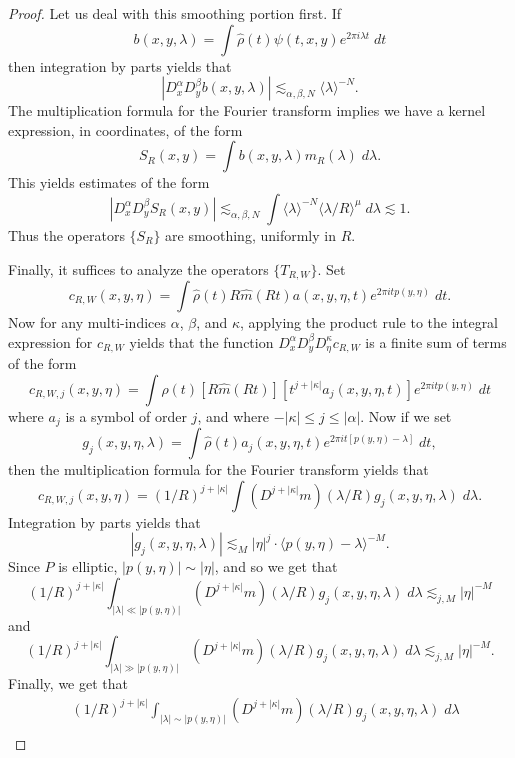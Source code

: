 \begin{proof}
    Let us deal with this smoothing portion first. If
    \[ b(x,y,\lambda) = \int \widehat{\rho}(t) \psi(t,x,y) e^{2 \pi i \lambda t}\; dt \]
    then integration by parts yields that
    \[ |D^\alpha_x D^\beta_y b(x,y,\lambda)| \lesssim_{\alpha,\beta,N} \langle \lambda \rangle^{-N}. \]
    The multiplication formula for the Fourier transform implies we have a kernel expression, in coordinates, of the form
    \[ S_R(x,y) = \int b(x,y,\lambda) m_R(\lambda)\; d\lambda. \]
    This yields estimates of the form
    \[ |D^\alpha_x D^\beta_y S_R(x,y)| \lesssim_{\alpha,\beta,N} \int \langle \lambda \rangle^{-N} \langle \lambda / R \rangle^\mu\; d\lambda \lesssim 1. \]
    Thus the operators $\{ S_R \}$ are smoothing, uniformly in $R$.

    Finally, it suffices to analyze the operators $\{ T_{R,W} \}$. Set
    \[ c_{R,W}(x,y,\eta) = \int \widehat{\rho}(t) R \widehat{m}(Rt) a(x,y,\eta,t) e^{2 \pi i t p(y,\eta)}\; dt. \]
    Now for any multi-indices $\alpha$, $\beta$, and $\kappa$, applying the product rule to the integral expression for $c_{R,W}$ yields that the function $D^\alpha_x D^\beta_y D^\kappa_\eta c_{R,W}$ is a finite sum of terms of the form
    \[ c_{R,W,j}(x,y,\eta) = \int \widehat{\rho}(t) [R \widehat{m}(Rt)] [t^{j + |\kappa|} a_j(x,y,\eta,t)] e^{2 \pi i t p(y,\eta)}\; dt \]
    where $a_j$ is a symbol of order $j$, and where $- |\kappa| \leq j \leq |\alpha|$. Now if we set
    \[ g_j(x,y,\eta,\lambda) = \int \widehat{\rho}(t) a_j(x,y,\eta,t) e^{2 \pi i t[p(y,\eta) - \lambda]}\; dt, \]
    then the multiplication formula for the Fourier transform yields that
    \[ c_{R,W,j}(x,y,\eta) = (1/R)^{j + |\kappa|} \int (D^{j + |\kappa|} m)(\lambda / R) g_j(x,y,\eta,\lambda)\; d\lambda. \]
    Integration by parts yields that
    \[ |g_j(x,y,\eta,\lambda)| \lesssim_M |\eta|^j \cdot \langle p(y,\eta) - \lambda \rangle^{-M}. \]
    Since $P$ is elliptic, $|p(y,\eta)| \sim |\eta|$, and so we get that
    \[ (1/R)^{j + |\kappa|} \int_{|\lambda| \ll |p(y,\eta)|} (D^{j + |\kappa|} m)(\lambda / R) g_j(x,y,\eta,\lambda)\; d\lambda \lesssim_{j,M} |\eta|^{-M} \]
    and
    \[ (1/R)^{j + |\kappa|} \int_{|\lambda| \gg |p(y,\eta)|} (D^{j + |\kappa|} m)(\lambda / R) g_j(x,y,\eta,\lambda)\; d\lambda \lesssim_{j,M} |\eta|^{-M}. \]
    Finally, we get that
    \begin{align*}
        & (1/R)^{j + |\kappa|} \int_{|\lambda| \sim |p(y,\eta)|} (D^{j + |\kappa|} m)(\lambda / R) g_j(x,y,\eta,\lambda)\; d\lambda\\

\end{align*}
\end{proof}
